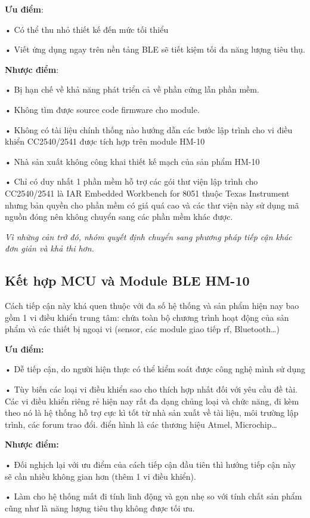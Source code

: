 \textbf{Ưu điểm}: 

• Có thể thu nhỏ thiết kế đến mức tối thiểu

• Viết ứng dụng ngay trên nền tảng BLE sẽ tiết kiệm tối đa năng lượng tiêu thụ.

\textbf{Nhược điểm}: 

• Bị hạn chế về khả năng phát triển cả về phần cứng lẫn phần mềm.

• Không tìm được source code firmware cho module.

• Không có tài liệu chính thống nào hướng dẫn các bước lập trình cho vi điều khiển CC2540/2541 được tích hợp trên module HM-10

• Nhà sản xuất không công khai thiết kế mạch của sản phẩm HM-10

• Chỉ có duy nhất 1 phần mềm hỗ trợ các gói thư viện lập trình cho CC2540/2541 là IAR Embedded Workbench for 8051 thuộc Texas Instrument nhưng bản quyền cho phần mềm có giá quá cao và các thư viện này sử dụng mã nguồn đóng nên không chuyển sang các phần mềm khác được.

\textit{Vì những cản trở đó, nhóm quyết định chuyển sang phương pháp tiếp cận khác đơn giản và khả thi hơn.}

\subsection{Kết hợp MCU và Module BLE HM-10}
Cách tiếp cận này khá quen thuộc với đa số hệ thống và sản phẩm hiện nay bao gồm 1 vi điều khiển trung tâm: chứa toàn bộ chương trình hoạt động của sản phẩm và các thiết bị ngoại vi (sensor, các module giao tiếp rf, Bluetooth…)

\textbf{Ưu điểm: }

• Dễ tiếp cận, do người hiện thực có thể kiểm soát được công nghệ mình sử dụng

• Tùy biến các loại vi điều khiển sao cho thích hợp nhất đối với yêu cầu đề tài. Các vi điều khiển riêng rẻ hiện nay rất đa dạng chủng loại và chức năng, đi kèm theo nó là hệ thống hỗ trợ cực kì tốt từ nhà sản xuất về tài liệu, môi trường lập trình, các forum trao đổi. điển hình là các thương hiệu Atmel, Microchip…

\textbf{Nhược điểm:} 

• Đối nghịch lại với ưu điểm của cách tiếp cận đầu tiên thì hướng tiếp cận này sẽ cần nhiều không gian hơn (thêm 1 vi điều khiển).

• Làm cho hệ thống mất đi tính linh động và gọn nhẹ so với tính chất sản phẩm cũng như là năng lượng tiêu thụ không được tối ưu.

